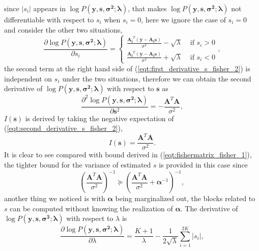 \documentclass[proposal]{umthesis}          %
\begin{document}
since $|s_{i}|$ appears in $\log P(\mathbf{y,s,\sigma^{2};\lambda})$, that makes $\log P(\mathbf{y,s,\sigma^{2};\lambda})$ not differentiable with respect to $s_{i}$ when $s_{i} = 0$, here we ignore the case of  $s_{i} = 0$ and consider the other two situations, 
\begin{equation} \label{eqt:first_derivative_s_fisher_2}
\frac{\partial \log P(\mathbf{y,s,\sigma^{2};\lambda})}{\partial s_{i}} = \begin{cases}
 \frac{\mathbf{A_{i}}^{T}(\mathbf{y-A_{i}s})}{\sigma^{2}} -\sqrt{\lambda} & \text{ if } s_{i} > 0 \\ 
 \frac{\mathbf{A_{i}}^{T}(\mathbf{y-A_{i}s})}{\sigma^{2}} + \sqrt{\lambda} & \text{ if } s_{i} < 0 
\end{cases},
\end{equation}
the second term at the right hand side of (\ref{eqt:first_derivative_s_fisher_2}) is independent on $s_{i}$ under the two situations, therefore we can obtain the second derivative of $\log P(\mathbf{y,s,\sigma^{2};\lambda})$ with respect to $\mathbf{s}$ as
\begin{equation} \label{eqt:second_derivative_s_fisher_2}
\frac{\partial^{2} \log P(\mathbf{y,s,\sigma^{2};\lambda})}{\partial \mathbf{s}^2} = -\frac{\mathbf{A}^{T}\mathbf{A}}{\sigma^{2}},
\end{equation}
$I(\mathbf{s})$ is derived by taking the negative expectation of (\ref{eqt:second_derivative_s_fisher_2}), 
\begin{equation}  \label{eqt:fishermatrix_s_fisher_2}
I(\mathbf{s}) = \frac{\mathbf{A}^{T}\mathbf{A}}{\sigma^{2}}.
\end{equation}
It is clear to see compared with bound derived in (\ref{eqt:fishermatrix_fisher_1}), the tighter bound for the variance of estimated $s$ is provided in this case since
\begin{equation}  \label{eqt:fishermatrix_compare_fisher_2}
(\frac{\mathbf{A}^{T}\mathbf{A}}{\sigma^{2}})^{-1} \succeq (\frac{\mathbf{A}^{T}\mathbf{A}}{\sigma^{2}} + \boldsymbol{\alpha}^{-1})^{-1}, 
\end{equation}
another thing we noticed is with $\mathbf{\alpha}$ being marginalized out, the blocks related to $s$ can be computed without knowing the realization of $\mathbf{\alpha}$.
The derivative of $\log P(\mathbf{y,s,\sigma^{2};\lambda})$ with respect to $\lambda$ is
\begin{equation}
\frac{\partial \log P(\mathbf{y,s,\sigma^{2};\lambda})}{\partial \lambda} = \frac{K+1}{\lambda} - \frac{1}{2 \sqrt{\lambda}} \sum_{i=1}^{2K}|s_{i}|,
\end{equation}
\end{document}
